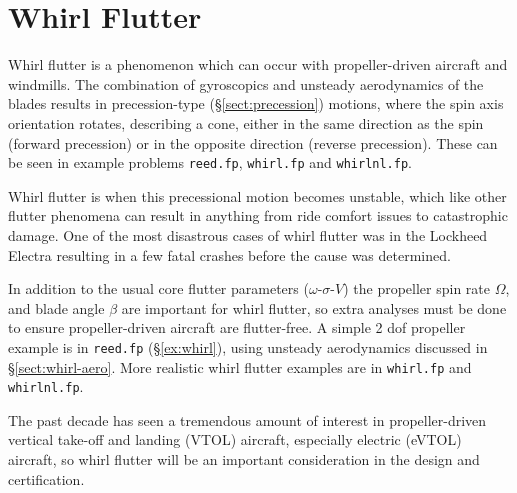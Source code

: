 \documentclass[10pt,openany,twoside]{book}
\numberwithin{equation}{section}   %
\newcommand{\Code}[1]{{\small\tt #1}}
\newcommand{\Sectref}[1]{\S\ref{#1}}
\newcommand{\OSV}{$\omega$-$\sigma$-$V$\:}               %
\begin{document}
\chapter{Whirl Flutter}\label{chap:whirl}
Whirl flutter is a phenomenon which can occur with propeller-driven aircraft
and windmills.
The combination of gyroscopics and unsteady aerodynamics of the blades
results in
precession-type (\Sectref{sect:precession})
motions, where the spin axis orientation rotates, describing a cone, either
in the same direction as the spin (forward precession) or in
the opposite direction (reverse precession).
These can be seen in example problems \Code{reed.fp}, \Code{whirl.fp} and \Code{whirlnl.fp}.

Whirl flutter is when this precessional motion becomes unstable,
which like other flutter phenomena can result in anything from
ride comfort issues to catastrophic damage.
One of the most disastrous cases of whirl flutter was in the Lockheed
Electra resulting in a few fatal crashes before the cause was
determined\cite{lockheedcrash}.

In addition to the usual core flutter parameters (\OSV) the propeller spin rate
$\Omega$, and blade angle $\beta$ 
are important for whirl flutter, so extra analyses must be done to
ensure propeller-driven aircraft are flutter-free.  A simple 2 dof
propeller example is in \Code{reed.fp}
(\Sectref{ex:whirl}), using unsteady aerodynamics discussed in \Sectref{sect:whirl-aero}.
More realistic whirl flutter examples are in \Code{whirl.fp} and
\Code{whirlnl.fp}.

The past decade has seen a tremendous amount of interest in
propeller-driven vertical take-off and landing (VTOL) aircraft,
especially electric (eVTOL) aircraft, so whirl flutter
will be an important consideration in the design and certification.
\end{document}
